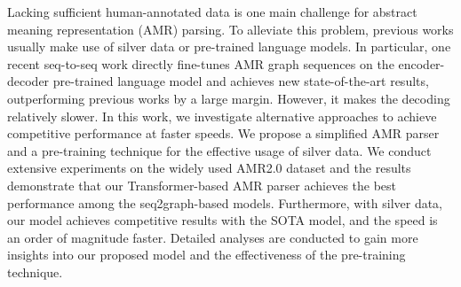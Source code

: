 Lacking sufficient human-annotated data is one main challenge for abstract meaning representation (AMR) parsing. To alleviate this problem, previous works usually make use of silver data or pre-trained language models. In particular, one recent seq-to-seq work directly fine-tunes AMR graph sequences on the encoder-decoder pre-trained language model and achieves new state-of-the-art results, outperforming previous works by a large margin. However, it makes the decoding relatively slower. In this work, we investigate alternative approaches to achieve competitive performance at faster speeds. We propose a simplified AMR parser and a pre-training technique for the effective usage of silver data. We conduct extensive experiments on the widely used AMR2.0 dataset and the results demonstrate that our Transformer-based AMR parser achieves the best performance among the seq2graph-based models. Furthermore, with silver data, our model achieves competitive results with the SOTA model, and the speed is an order of magnitude faster. Detailed analyses are conducted to gain more insights into our proposed model and the effectiveness of the pre-training technique.
